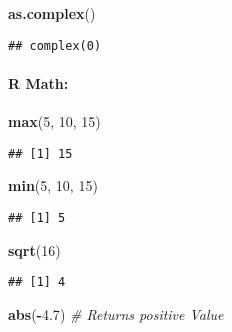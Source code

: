 \documentclass[
]{article}
\newenvironment{Shaded}{\begin{snugshade}}{\end{snugshade}}
\newcommand{\CommentTok}[1]{\textcolor[rgb]{0.56,0.35,0.01}{\textit{#1}}}
\newcommand{\DecValTok}[1]{\textcolor[rgb]{0.00,0.00,0.81}{#1}}
\newcommand{\FloatTok}[1]{\textcolor[rgb]{0.00,0.00,0.81}{#1}}
\newcommand{\FunctionTok}[1]{\textcolor[rgb]{0.13,0.29,0.53}{\textbf{#1}}}
\newcommand{\NormalTok}[1]{#1}
\newcommand{\SpecialCharTok}[1]{\textcolor[rgb]{0.81,0.36,0.00}{\textbf{#1}}}
\begin{document}
\begin{Shaded}
\begin{Highlighting}[]
\FunctionTok{as.complex}\NormalTok{()}
\end{Highlighting}
\end{Shaded}

\begin{verbatim}
## complex(0)
\end{verbatim}

\hypertarget{r-math}{%
\paragraph{R Math:}\label{r-math}}

\begin{Shaded}
\begin{Highlighting}[]
\FunctionTok{max}\NormalTok{(}\DecValTok{5}\NormalTok{, }\DecValTok{10}\NormalTok{, }\DecValTok{15}\NormalTok{)}
\end{Highlighting}
\end{Shaded}

\begin{verbatim}
## [1] 15
\end{verbatim}

\begin{Shaded}
\begin{Highlighting}[]
\FunctionTok{min}\NormalTok{(}\DecValTok{5}\NormalTok{, }\DecValTok{10}\NormalTok{, }\DecValTok{15}\NormalTok{)}
\end{Highlighting}
\end{Shaded}

\begin{verbatim}
## [1] 5
\end{verbatim}

\begin{Shaded}
\begin{Highlighting}[]
\FunctionTok{sqrt}\NormalTok{(}\DecValTok{16}\NormalTok{)}
\end{Highlighting}
\end{Shaded}

\begin{verbatim}
## [1] 4
\end{verbatim}

\begin{Shaded}
\begin{Highlighting}[]
\FunctionTok{abs}\NormalTok{(}\SpecialCharTok{{-}}\FloatTok{4.7}\NormalTok{) }\CommentTok{\# Returns positive Value}
\end{Highlighting}
\end{Shaded}
\end{document}
